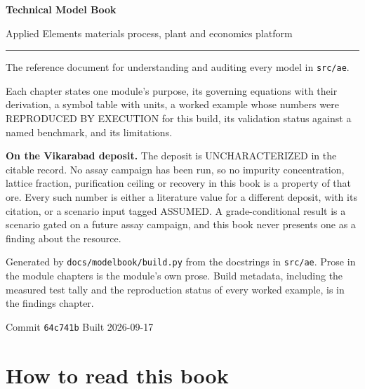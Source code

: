 \documentclass[10pt,a4paper,twoside]{report}
\newenvironment{caution}
  {\begin{snugshade}\color{ink}\small}
  {\end{snugshade}}
\begin{document}
\thispagestyle{empty}
\vspace*{2.2cm}
{\fontsize{30}{34}\selectfont\bfseries Technical Model Book\par}
\vspace{0.5em}
{\Large\color{slate} Applied Elements materials process, plant and economics platform\par}
\vspace{2.2cm}
\rule{\textwidth}{1.2pt}
\vspace{0.6em}

{\large The reference document for understanding and auditing every model in
\texttt{src/ae}.\par}

\vspace{0.5em}
Each chapter states one module's purpose, its governing equations with their
derivation, a symbol table with units, a worked example whose numbers were
REPRODUCED BY EXECUTION for this build, its validation status against a named
benchmark, and its limitations.

\vspace{2.0cm}
\begin{caution}
\textbf{On the Vikarabad deposit.} The deposit is UNCHARACTERIZED in the
citable record. No assay campaign has been run, so no impurity concentration,
lattice fraction, purification ceiling or recovery in this book is a property
of that ore. Every such number is either a literature value for a different
deposit, with its citation, or a scenario input tagged ASSUMED. A
grade-conditional result is a scenario gated on a future assay campaign, and
this book never presents one as a finding about the resource.
\end{caution}

\vfill
{\footnotesize\color{slate}
Generated by \texttt{docs/modelbook/build.py} from the docstrings in
\texttt{src/ae}. Prose in the module chapters is the module's own prose.
Build metadata, including the measured test tally and the reproduction status
of every worked example, is in the findings chapter.\par
Commit \texttt{64c741b} \quad Built 2026-09-17\par}
\clearpage


\tableofcontents
\clearpage

\chapter*{How to read this book}
\end{document}
